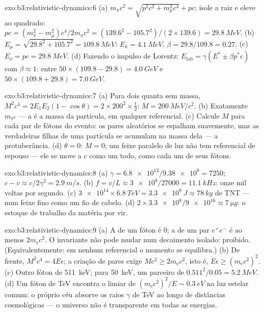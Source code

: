 \begin{solution}{exo:b3:relativistic-dynamics:6}
(a) $m_\pi c^2 = \sqrt{p^2c^2 + m_\mu^2c^4} + pc$; isole a raiz e
eleve ao quadrado: $pc = (m_\pi^2 - m_\mu^2)c^4/2m_\pi c^2 =
(139.6^2 - 105.7^2)/(2 \times 139.6) = \qty{29.8}{MeV}$. (b) $E_\mu =
\sqrt{29.8^2 + 105.7^2} = \qty{109.8}{MeV}$: $E_k = \qty{4.1}{MeV}$,
$\beta = 29.8/109.8 = 0.27$. (c) $E_\nu = pc = \qty{29.8}{MeV}$. (d)
Fazendo o impulso de Lorentz: $E_{\text{lab}} = \gamma(E^* \pm \beta p^*c)$ com $\beta
\approx 1$: entre $50 \times (109.8 - 29.8) = \qty{4.0}{GeV}$ e
$50 \times (109.8 + 29.8) = \qty{7.0}{GeV}$.
\end{solution}

\begin{solution}{exo:b3:relativistic-dynamics:7}
(a) Para dois quanta sem massa, $M^2c^4 = 2E_1E_2(1 - \cos\theta) =
2 \times 200^2 \times \tfrac12$: $M = \qty{200}{MeV}/c^2$. (b)
Exatamente $m_{\pi^0}$ --- a  é a massa da partícula,
em qualquer referencial. (c) Calcule $M$ para cada par de fótons do
evento: os pares aleatórios se espalham suavemente, mas as verdadeiras
filhas de uma partícula se acumulam na massa dela --- a protuberância.
(d) $\theta = 0$: $M = 0$; um feixe paralelo de luz não tem
referencial de repouso --- ele se move a $c$ como um todo, como cada um
de seus fótons.
\end{solution}

\begin{solution}{exo:b3:relativistic-dynamics:8}
(a) $\gamma = \num{6.8e12}/\num{9.38e8} = 7250$; $c - v \approx
c/2\gamma^2 = \qty{2.9}{m/s}$. (b) $f = v/L \approx \num{3e8}/27000 =
\qty{11.1}{kHz}$: onze mil voltas por segundo. (c) $\num{3e14}
\times \qty{6.8}{TeV} = \qty{3.3e8}{J} \approx \qty{78}{kg}$ de TNT
--- num feixe fino como um fio de cabelo. (d) $2 \times \num{3.3e8}/\num{9e16} \approx
\qty{7}{\micro g}$: o estoque de trabalho da matéria por vir.
\end{solution}

\begin{solution}{exo:b3:relativistic-dynamics:9}
(a) A  de um fóton é $0$; a de um par $e^+e^-$ é ao
menos $2m_{\text{e}}c^2$. O invariante não pode mudar num decaimento
isolado: proibido. (Equivalentemente: em nenhum referencial o momento
se equilibra.) (b) De frente, $M^2c^4 = 4E\epsilon$; a criação de pares
exige $Mc^2 \ge
2m_{\text{e}}c^2$, isto é, $E\epsilon \ge (m_{\text{e}}c^2)^2$. (c)
Outro fóton de \qty{511}{keV}; para \qty{50}{keV}, um parceiro de
$0.511^2/0.05 = \qty{5.2}{MeV}$. (d) Um fóton de TeV encontra o limiar
de $(m_{\text{e}}c^2)^2/E \sim \qty{0.3}{eV}$ na luz estelar comum: o
próprio céu absorve os raios $\gamma$ de TeV ao longo de distâncias
cosmológicas --- o universo não é transparente em todas as energias.
\end{solution}

